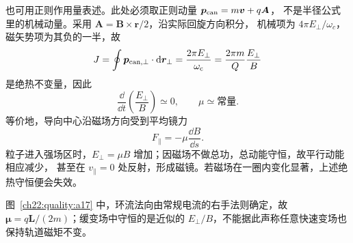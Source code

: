 {\begin{xesolution}
也可用正则作用量表述。此处必须取正则动量 $\boldsymbol p_{\rm can}=m\boldsymbol v+q\boldsymbol A$，
不是半径公式里的机械动量。采用 $\boldsymbol A=\boldsymbol B\times\boldsymbol r/2$，沿实际回旋方向积分，
机械项为 $4\pi E_\perp/\omega_c$，磁矢势项为其负的一半，故
\begin{equation}
  J=\oint\bm{p}_{{\rm can},\perp}\cdot\mathop{}\!\mathrm d\bm{r}_\perp
  =\frac{2\pi E_\perp}{\omega_{\rm c}}
  =\frac{2\pi m}{Q}\frac{E_\perp}{B}
\end{equation}
是绝热不变量，因此
\begin{equation}
  \boxed{\frac{\dd}{\dd t}\left(\frac{E_\perp}{B}\right)\simeq0},
  \qquad \boxed{\mu\simeq\text{常量}}.
\end{equation}
等价地，导向中心沿磁场方向受到平均镜力
\begin{equation}
  F_\parallel=-\mu\frac{\dd B}{\dd s}.
\end{equation}
粒子进入强场区时，$E_\perp=\mu B$ 增加；因磁场不做总功，总动能守恒，故平行动能相应减少，
甚至在 $v_\parallel=0$ 处反射，形成磁镜。若磁场在一圈内变化显著，上述绝热守恒便会失效。


图~\ref{ch22:quality:a17} 中，环流法向由常规电流的右手法则确定，故 $\boldsymbol\mu=q\boldsymbol L/(2m)$；缓变场中守恒的是近似的 $E_\perp/B$，不能据此声称任意快速变场也保持轨道磁矩不变。
\end{xesolution}
}

\endgroup

\endgroup
